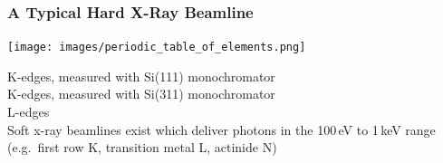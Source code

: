 \documentclass[10pt, xcolor=x11names, compress, handout]{beamer}
\begin{document}
\begin{frame}
\begin{columns}[T]
\begin{column}{0.5\linewidth}
{      }%
    \end{column}
    \begin{column}{0.5\linewidth}
      \begin{overlayarea}{\linewidth}{5in}
      \end{overlayarea}
    \end{column}
  \end{columns}


\end{frame}


\begin{frame}
  \frametitle{A Typical Hard X-Ray Beamline}
  \begin{center}
    \texttt{[image: images/periodic\_table\_of\_elements.png]}
    
    \small
    {\color{SteelBlue3}K-edges, measured with Si(111) monochromator}\\
    {\color{Cyan3}K-edges, measured with Si(311) monochromator}\\
    {\color{Brown4}L-edges}\\[2ex]
    Soft x-ray beamlines exist which deliver photons in the 100\,eV to
    1\,keV range (e.g.\ first row K, transition metal L, actinide N)
  \end{center}
\end{frame}
\end{document}
